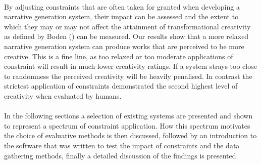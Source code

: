 \documentclass[letterpaper]{article}
\begin{document}
\\By adjusting constraints that are often taken for granted when developing a narrative generation system, their impact can be assessed and the extent to which they may or may not affect the attainment of transformational creativity as defined by Boden (\citeyear{boden2004creative}) can be measured. Our results show that a more relaxed narrative generation system can produce works that are perceived to be more creative. This is a fine line, as too relaxed or too moderate applications of constraint will result in much lower creativity ratings. If a system strays too close to randomness the perceived creativity will be heavily penalised. In contrast the strictest application of constraints demonstrated the second highest level of creativity when evaluated by humans.\\
\\In the following sections a selection of existing systems are presented and shown to represent a spectrum of constraint application. How this spectrum motivates the choice of evaluative methods is then discussed, followed by an introduction to the software that was written to test the impact of constraints and the data gathering methods, finally a detailed discussion of the findings is presented.

\end{document}
